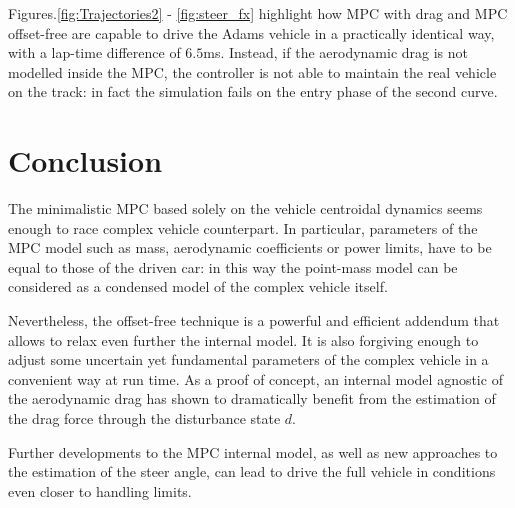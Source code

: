 \documentclass[conference]{IEEEtran} %
\begin{document}
Figures.\ref{fig:Trajectories2} - \ref{fig:steer_fx} highlight how MPC with drag and MPC offset-free are capable to drive the Adams vehicle in a practically identical way, with a lap-time difference of $6.5$ms. Instead, if the aerodynamic drag is not modelled inside the MPC, the controller is not able to maintain the real vehicle on the track: in fact the simulation fails on the entry phase of the second curve.



\section{Conclusion}
The minimalistic MPC based solely on the vehicle centroidal dynamics seems enough to race complex vehicle counterpart.
In particular, parameters of the MPC model such as mass, aerodynamic coefficients or power limits, have to be equal to those of the driven car: in this way the point-mass model can be considered as a condensed model of the complex vehicle itself.

Nevertheless, the offset-free technique is a powerful and efficient addendum that allows to relax even further the internal model. It is also forgiving enough to adjust some uncertain yet fundamental parameters of the complex vehicle in a convenient way at run time.
As a proof of concept, an internal model agnostic of the aerodynamic drag has shown to dramatically benefit from the estimation of the drag force through the disturbance state $d$.

Further developments to the MPC internal model, as well as new approaches to the estimation of the steer angle, can lead to drive the full vehicle in conditions even closer to handling limits.
\label{sec:conclusion}





\end{document}
